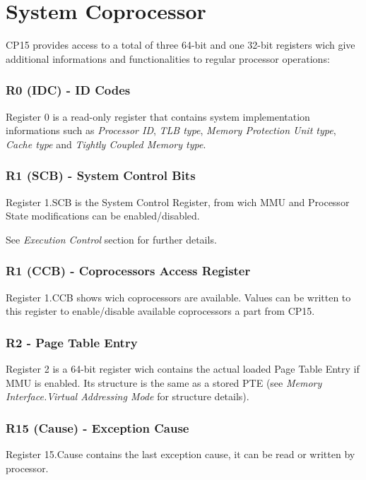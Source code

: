 \section{System Coprocessor}

CP15 provides access to a total of three 64-bit and one 32-bit registers wich give additional informations and functionalities to regular processor operations:

\subsubsection{R0 (IDC) - ID Codes}
Register 0 is a read-only register that contains system implementation informations such as \emph{Processor ID}, \emph{TLB type}, \emph{Memory Protection Unit type}, \emph{Cache type} and \emph{Tightly Coupled Memory type}.

\subsubsection{R1 (SCB) - System Control Bits}
Register 1.SCB is the System Control Register, from wich MMU and Processor State modifications can be enabled/disabled.

See \emph{Execution Control} section for further details.

\subsubsection{R1 (CCB) - Coprocessors Access Register}
Register 1.CCB shows wich coprocessors are available. Values can be written to this register to enable/disable available coprocessors a part from CP15.



\subsubsection{R2 - Page Table Entry}
Register 2 is a 64-bit register wich contains the actual loaded Page Table Entry if MMU is enabled. Its structure is the same as a stored PTE (see \emph{Memory Interface.Virtual Addressing Mode} for structure details).

\subsubsection{R15 (Cause) - Exception Cause}
Register 15.Cause contains the last exception cause, it can be read or written by processor.

